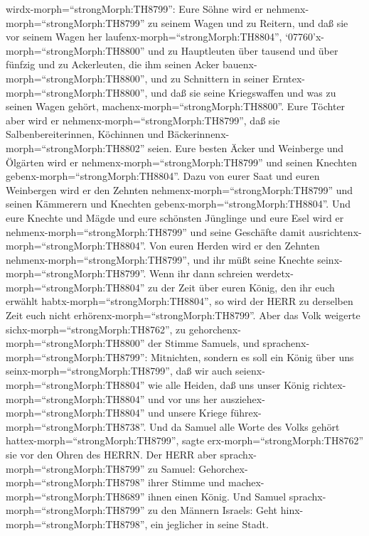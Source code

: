 wirdx-morph=``strongMorph:TH8799'': Eure Söhne wird er
nehmenx-morph=``strongMorph:TH8799'' zu seinem Wagen und zu Reitern, und
daß sie vor seinem Wagen her laufenx-morph=``strongMorph:TH8804'',
 `07760'\textbar x-morph=``strongMorph:TH8800'' und zu
Hauptleuten über tausend und über fünfzig und zu Ackerleuten, die ihm
seinen Acker bauenx-morph=``strongMorph:TH8800'', und zu Schnittern in
seiner Erntex-morph=``strongMorph:TH8800'', und daß sie seine
Kriegswaffen und was zu seinen Wagen gehört,
machenx-morph=``strongMorph:TH8800''.  Eure Töchter aber
wird er nehmenx-morph=``strongMorph:TH8799'', daß sie
Salbenbereiterinnen, Köchinnen und
Bäckerinnenx-morph=``strongMorph:TH8802'' seien.  Eure
besten Äcker und Weinberge und Ölgärten wird er
nehmenx-morph=``strongMorph:TH8799'' und seinen Knechten
gebenx-morph=``strongMorph:TH8804''.  Dazu von eurer Saat
und euren Weinbergen wird er den Zehnten
nehmenx-morph=``strongMorph:TH8799'' und seinen Kämmerern und Knechten
gebenx-morph=``strongMorph:TH8804''.  Und eure Knechte und
Mägde und eure schönsten Jünglinge und eure Esel wird er
nehmenx-morph=``strongMorph:TH8799'' und seine Geschäfte damit
ausrichtenx-morph=``strongMorph:TH8804''.  Von euren Herden
wird er den Zehnten nehmenx-morph=``strongMorph:TH8799'', und ihr müßt
seine Knechte seinx-morph=``strongMorph:TH8799''.  Wenn ihr
dann schreien werdetx-morph=``strongMorph:TH8804'' zu der Zeit über
euren König, den ihr euch erwählt habtx-morph=``strongMorph:TH8804'', so
wird der HERR zu derselben Zeit euch nicht
erhörenx-morph=``strongMorph:TH8799''.  Aber das Volk
weigerte sichx-morph=``strongMorph:TH8762'', zu
gehorchenx-morph=``strongMorph:TH8800'' der Stimme Samuels, und
sprachenx-morph=``strongMorph:TH8799'': Mitnichten, sondern es soll ein
König über uns seinx-morph=``strongMorph:TH8799'',  daß wir
auch seienx-morph=``strongMorph:TH8804'' wie alle Heiden, daß uns unser
König richtex-morph=``strongMorph:TH8804'' und vor uns her
ausziehex-morph=``strongMorph:TH8804'' und unsere Kriege
führex-morph=``strongMorph:TH8738''.  Und da Samuel alle
Worte des Volks gehört hattex-morph=``strongMorph:TH8799'', sagte
erx-morph=``strongMorph:TH8762'' sie vor den Ohren des HERRN.
 Der HERR aber sprachx-morph=``strongMorph:TH8799'' zu
Samuel: Gehorchex-morph=``strongMorph:TH8798'' ihrer Stimme und
machex-morph=``strongMorph:TH8689'' ihnen einen König. Und Samuel
sprachx-morph=``strongMorph:TH8799'' zu den Männern Israels: Geht
hinx-morph=``strongMorph:TH8798'', ein jeglicher in seine Stadt.

